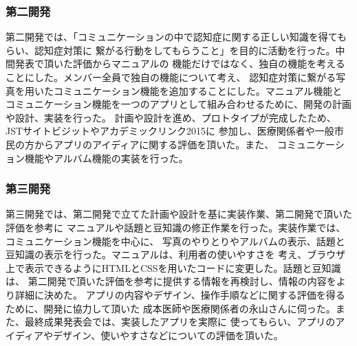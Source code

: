 \documentclass[twocolumn,draft]{jsarticle}
\begin{document}
\subsubsection{第二開発}
\begin{hissu}
第二開発では、「コミュニケーションの中で認知症に関する正しい知識を得てもらい、認知症対策に
繋がる行動をしてもらうこと」を目的に活動を行った。中間発表で頂いた評価からマニュアルの
機能だけではなく、独自の機能を考えることにした。メンバー全員で独自の機能について考え、
認知症対策に繋がる写真を用いたコミュニケーション機能を追加することにした。マニュアル機能と
コミュニケーション機能を一つのアプリとして組み合わせるために、開発の計画や設計、実装を行った。
計画や設計を進め、プロトタイプが完成したため、JSTサイトビジットやアカデミックリンク2015に
参加し、医療関係者や一般市民の方からアプリのアイディアに関する評価を頂いた。また、
コミュニケーション機能やアルバム機能の実装を行った。
\end{hissu}

\subsubsection{第三開発}
\begin{hissu}
第三開発では、第二開発で立てた計画や設計を基に実装作業、第二開発で頂いた評価を参考に
マニュアルや話題と豆知識の修正作業を行った。実装作業では、コミュニケーション機能を中心に、
写真のやりとりやアルバムの表示、話題と豆知識の表示を行った。マニュアルは、利用者の使いやすさを
考え、ブラウザ上で表示できるようにHTMLとCSSを用いたコードに変更した。話題と豆知識は、
第二開発で頂いた評価を参考に提供する情報を再検討し、情報の内容をより詳細に決めた。
アプリの内容やデザイン、操作手順などに関する評価を得るために、開発に協力して頂いた
成本医師や医療関係者の永山さんに伺った。また、最終成果発表会では、実装したアプリを実際に
使ってもらい、アプリのアイディアやデザイン、使いやすさなどについての評価を頂いた。

\end{hissu}
\end{document}
